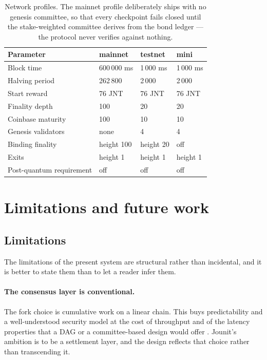\documentclass{article}
\begin{document}
\begin{table}[t]
\centering
\begin{tabular}{llll}
\toprule
\textbf{Parameter} & \textbf{mainnet} & \textbf{testnet} & \textbf{mini} \\
\midrule
Block time & 600\,000 ms & 1\,000 ms & 1\,000 ms \\
Halving period & 262\,800 & 2\,000 & 2\,000 \\
Start reward & 76 JNT & 76 JNT & 76 JNT \\
Finality depth & 100 & 20 & 20 \\
Coinbase maturity & 100 & 10 & 10 \\
Genesis validators & none & 4 & 4 \\
Binding finality & height 100 & height 20 & off \\
Exits & height 1 & height 1 & height 1 \\
Post-quantum requirement & off & off & off \\
\bottomrule
\end{tabular}
\caption{Network profiles. The mainnet profile deliberately ships with no
genesis committee, so that every checkpoint fails closed until the
stake-weighted committee derives from the bond ledger --- the protocol never
verifies against nothing.}
\label{tab:profiles}
\end{table}


\section{Limitations and future work}
\label{sec:future}

\subsection{Limitations}

The limitations of the present system are structural rather than incidental,
and it is better to state them than to let a reader infer them.

\paragraph{The consensus layer is conventional.} The fork choice is cumulative
work on a linear chain. This buys predictability and a well-understood security
model at the cost of throughput and of the latency properties that a DAG or a
committee-based design would offer \cite{eyal2014securitybitcoin,trivedi2017sok}.
Jounit's ambition is to be a settlement layer, and the design reflects that
choice rather than transcending it.
\end{document}
